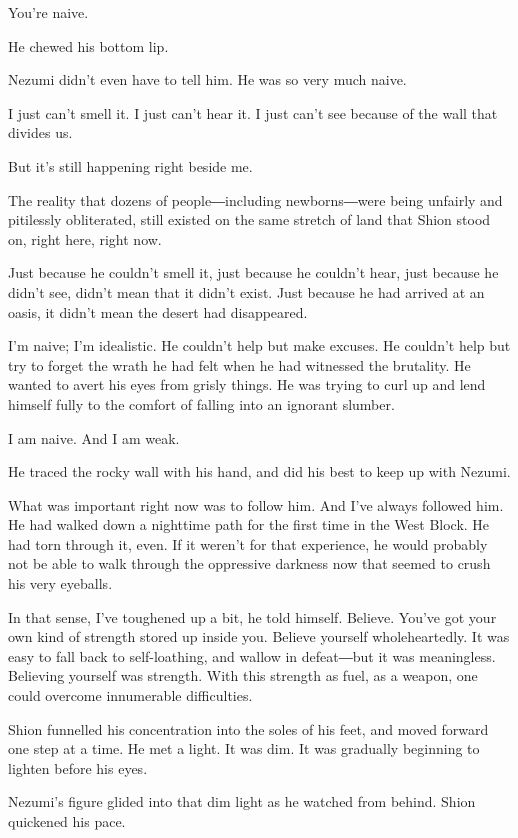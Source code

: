 You're naive.

He chewed his bottom lip.

Nezumi didn't even have to tell him. He was so very much naive.

I just can't smell it. I just can't hear it. I just can't see because of
the wall that divides us.

But it's still happening right beside me.

The reality that dozens of people―including newborns―were being unfairly
and pitilessly obliterated, still existed on the same stretch of land
that Shion stood on, right here, right now.

Just because he couldn't smell it, just because he couldn't hear, just
because he didn't see, didn't mean that it didn't exist. Just because he
had arrived at an oasis, it didn't mean the desert had disappeared.

I'm naive; I'm idealistic. He couldn't help but make excuses. He
couldn't help but try to forget the wrath he had felt when he had
witnessed the brutality. He wanted to avert his eyes from grisly things.
He was trying to curl up and lend himself fully to the comfort of
falling into an ignorant slumber.

I am naive. And I am weak.

He traced the rocky wall with his hand, and did his best to keep up with
Nezumi.

What was important right now was to follow him. And I've always followed
him. He had walked down a nighttime path for the first time in the West
Block. He had torn through it, even. If it weren't for that experience,
he would probably not be able to walk through the oppressive darkness
now that seemed to crush his very eyeballs.

In that sense, I've toughened up a bit, he told himself. Believe. You've
got your own kind of strength stored up inside you. Believe yourself
wholeheartedly. It was easy to fall back to self-loathing, and wallow in
defeat―but it was meaningless. Believing yourself was strength. With
this strength as fuel, as a weapon, one could overcome innumerable
difficulties.

Shion funnelled his concentration into the soles of his feet, and moved
forward one step at a time. He met a light. It was dim. It was gradually
beginning to lighten before his eyes.

Nezumi's figure glided into that dim light as he watched from behind.
Shion quickened his pace.


